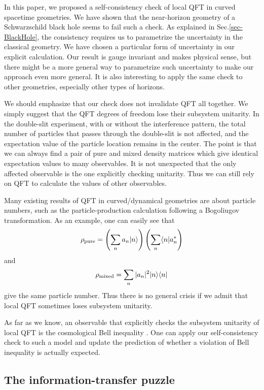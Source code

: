 \documentclass[aps,showpacs,twocolumn,floats,prd,superscriptaddress,nofootinbib]{revtex4-1}
\begin{document}
In this paper, we proposed a self-consistency check of local QFT in curved spacetime geometries.
We have shown that the near-horizon geometry of a Schwarzschild black hole seems to fail such a check.
As explained in Sec.\ref{sec-BlackHole}, the consistency requires us to parametrize the uncertainty in the classical geometry.
We have chosen a particular form of uncertainty in our explicit calculation.
Our result is gauge invariant and makes physical sense, but there might be a more general way to parametrize such uncertainty to make our approach even more general.
It is also interesting to apply the same check to other geometries, especially other types of horizons.

We should emphasize that our check does not invalidate QFT all together.
We simply suggest that the QFT degrees of freedom lose their subsystem unitarity.
In the double-slit experiment, with or without the interference pattern, the total number of particles that passes through the double-slit is not affected, and the expectation value of the particle location remains in the center.
The point is that we can always find a pair of pure and mixed density matrices which give identical expectation values to many observables.
It is not unexpected that the only affected observable is the one explicitly checking unitarity.
Thus we can still rely on QFT to calculate the values of other observables.

Many existing results of QFT in curved/dynamical geometries are about particle numbers, such as the particle-production calculation following a Bogoliugov transformation. 
As an example, one can easily see that
\begin{equation}
\rho_{\rm pure} = \left(\sum_n a_n|n\rangle\right)
\left(\sum_n \langle n| a_n^*\right)
\end{equation}
and
\begin{equation}
\rho_{\rm mixed} = \sum_n |a_n|^2 |n\rangle\langle n|
\end{equation}
give the same particle number. 
Thus there is no general crisis if we admit that local QFT sometimes loses subsystem unitarity. 

As far as we know, an observable that explicitly checks the subsystem unitarity of local QFT is the cosmological Bell inequality \cite{Mal15}. 
One can apply our self-consistency check to such a model and update the prediction of whether a violation of Bell inequality is actually expected.


\subsection{The information-transfer puzzle}
\end{document}
